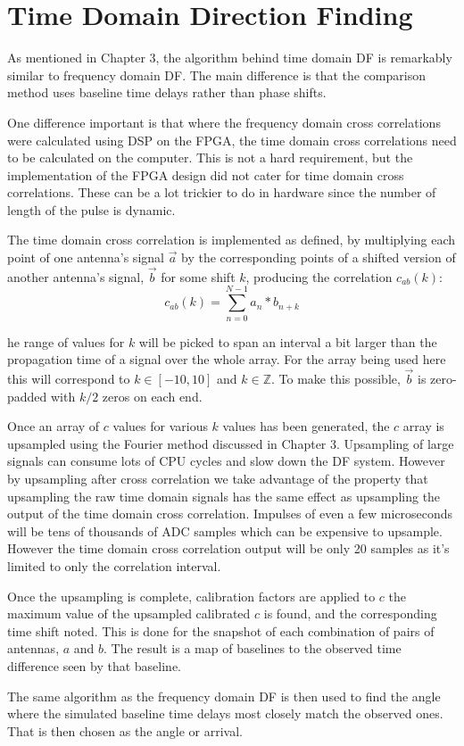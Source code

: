 \section{Time Domain Direction Finding}

As mentioned in Chapter 3, the algorithm behind time domain DF is remarkably similar to frequency domain DF. The main difference is that the comparison method uses baseline time delays rather than phase shifts. 

One difference important is that where the frequency domain cross correlations were calculated using DSP on the FPGA, the time domain cross correlations need to be calculated on the computer. This is not a hard requirement, but the implementation of the FPGA design did not cater for time domain cross correlations. These can be a lot trickier to do in hardware since the number of length of the pulse is dynamic.

The time domain cross correlation is implemented as defined, by multiplying each point of one antenna's signal \(\vec{a}\) by the corresponding points of a shifted version of another antenna's signal, \(\vec{b}\) for some shift \(k\), producing the correlation \(c_{ab}(k)\):
\begin{equation}
  c_{ab}(k) = \sum_{n = 0}^{N-1} a_{n} * b_{n+k}
\end{equation}

he range of values for \(k\) will be picked to span an interval a bit larger than the propagation time of a signal over the whole array. For the array being used here this will correspond to \(k\in [-10, 10]\) and \(k\in \mathbb{Z}\). To make this possible, \(\vec{b}\) is zero-padded with \(k/2\) zeros on each end.

Once an array of \(c\) values for various \(k\) values has been generated, the \(c\) array is upsampled using the Fourier method discussed in Chapter 3.  Upsampling of large signals can consume lots of CPU cycles and slow down the DF system. However by upsampling after cross correlation we take advantage of the property that upsampling the raw time domain signals has the same effect as upsampling the output of the time domain cross correlation. Impulses of even a few microseconds will be tens of thousands of ADC samples which can be expensive to upsample. However the time domain cross correlation output will be only 20 samples as it's limited to only the correlation interval. 

Once the upsampling is complete, calibration factors are applied to \(c\) the maximum value of the upsampled calibrated \(c\) is found, and the corresponding time shift noted. This is done for the snapshot of each combination of pairs of antennas, \(a\) and \(b\). The result is a map of baselines to the observed time difference seen by that baseline.

The same algorithm as the frequency domain DF is then used to find the angle where the simulated baseline time delays most closely match the observed ones. That is then chosen as the angle or arrival.



